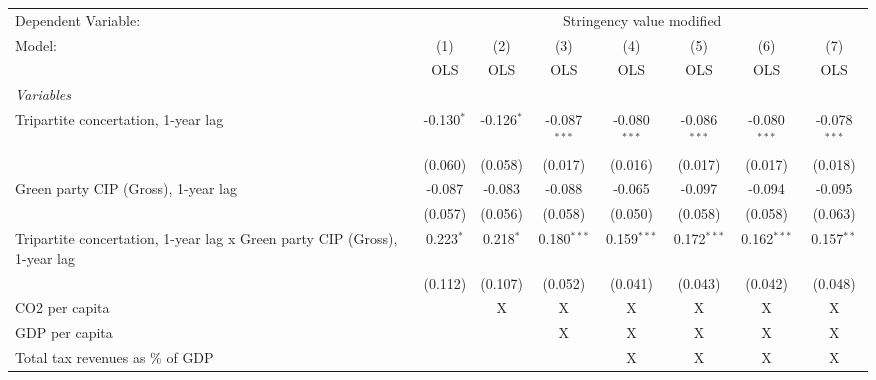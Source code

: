 
\begingroup
\centering
\begin{tabular}{lccccccc}
   \toprule
   Dependent Variable: & \multicolumn{7}{c}{Stringency value modified}\\
   Model:                                                                    & (1)          & (2)          & (3)            & (4)            & (5)            & (6)            & (7)\\  
                                                                             &  OLS         & OLS          & OLS            & OLS            & OLS            & OLS            & OLS\\  
   \midrule
   \emph{Variables}\\
   Tripartite concertation, 1-year lag                                       & -0.130$^{*}$ & -0.126$^{*}$ & -0.087$^{***}$ & -0.080$^{***}$ & -0.086$^{***}$ & -0.080$^{***}$ & -0.078$^{***}$\\   
                                                                             & (0.060)      & (0.058)      & (0.017)        & (0.016)        & (0.017)        & (0.017)        & (0.018)\\   
   Green party CIP (Gross), 1-year lag                                       & -0.087       & -0.083       & -0.088         & -0.065         & -0.097         & -0.094         & -0.095\\   
                                                                             & (0.057)      & (0.056)      & (0.058)        & (0.050)        & (0.058)        & (0.058)        & (0.063)\\   
   Tripartite concertation, 1-year lag x Green party CIP (Gross), 1-year lag & 0.223$^{*}$  & 0.218$^{*}$  & 0.180$^{***}$  & 0.159$^{***}$  & 0.172$^{***}$  & 0.162$^{***}$  & 0.157$^{**}$\\   
                                                                             & (0.112)      & (0.107)      & (0.052)        & (0.041)        & (0.043)        & (0.042)        & (0.048)\\   
   CO2 per capita                                                            &              & X            & X              & X              & X              & X              & X\\  
   GDP per capita                                                            &              &              & X              & X              & X              & X              & X\\  
   Total tax revenues as \% of GDP                                           &              &              &                & X              & X              & X              & X\\  

\end{tabular}
